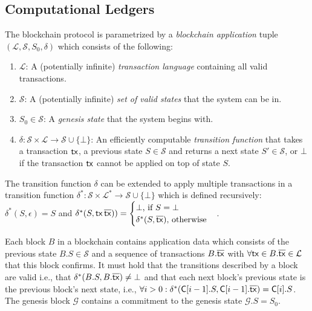 \subsection{Computational Ledgers}

The blockchain protocol is parametrized by a \emph{blockchain application}
tuple $(\mathcal{L}, \mathcal{S}, S_0, \delta)$ which consists of the following:

\begin{enumerate}
  \item $\mathcal{L}$: A (potentially infinite) \emph{transaction language} containing all valid
  transactions.
  \item $\mathcal{S}$: A (potentially infinite) \emph{set of valid states} that the system can be in.
  \item $S_0 \in \mathcal{S}$: A \emph{genesis state} that the system begins
  with.
  \item $\delta: \mathcal{S} \times \mathcal{L} \longrightarrow \mathcal{S} \cup \{\bot\}$:
  An efficiently computable \emph{transition function} that takes a transaction
  $\mathsf{tx}$, a previous state $S \in \mathcal{S}$ and returns a next state
  $S' \in \mathcal{S}$, or $\bot$ if the transaction $\mathsf{tx}$ cannot be applied on
  top of state $S$.
\end{enumerate}

The transition function $\delta$ can be extended to apply multiple transactions
in a transition function
$\delta^*: \mathcal{S} \times \mathcal{L}^* \longrightarrow \mathcal{S} \cup \{\bot\}$
which is defined recursively: $\delta^*(S, \epsilon) = S$ and
$\delta^*(S, \mathsf{tx}\,\overline{\mathsf{tx}})) = \begin{cases}
  \bot\text{, if } S = \bot\\
  \delta^*(S, \overline{\mathsf{tx}})\text{, otherwise}\end{cases}$.

Each block $B$ in a blockchain contains application data which consists of the
previous state $B.S \in \mathcal{S}$ and a sequence of transactions
$B.\overline{\mathsf{tx}}$ with $\forall \mathsf{tx} \in B.\overline{\mathsf{tx}} \in \mathcal{L}$ that this
block confirms. It must hold that the transitions described by a block are
valid i.e., that $\delta^*(B.S, B.\overline{\mathsf{tx}}) \neq \bot$ and that each next
block's previous state is the previous block's next state, i.e.,
$\forall i > 0: \delta^*(\mathsf{C}[i - 1].S, \mathsf{C}[i - 1].\overline{\mathsf{tx}}) = \mathsf{C}[i].S$.
The genesis block $\mathcal{G}$ contains a commitment
to the genesis state $\mathcal{G}.S = S_0$.

